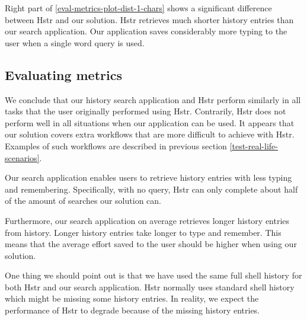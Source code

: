 Right part of \ref{eval-metrics-plot-dist-1-chars} shows a significant difference between Hstr and our solution. Hstr retrieves much shorter history entries than our search application. Our application saves considerably more typing to the user when a single word query is used. 

\subsection{Evaluating metrics}

We conclude that our history search application and Hstr perform similarly in all tasks that the user originally performed using Hstr. Contrarily, Hstr does not perform well in all situations when our application can be used. It appears that our solution covers extra workflows that are more difficult to achieve with Hstr. Examples of such workflows are described in previous section \ref{test-real-life-scenarios}. 

Our search application enables users to retrieve history entries with less typing and remembering. Specifically, with no query, Hstr can only complete about half of the amount of searches our solution can. 

Furthermore, our search application on average retrieves longer history entries from history. Longer history entries take longer to type and remember. This means that the average effort saved to the user should be higher when using our solution. 

One thing we should point out is that we have used the same full shell history for both Hstr and our search application. Hstr normally uses standard shell history which might be missing some history entries. In reality, we expect the performance of Hstr to degrade because of the missing history entries.


